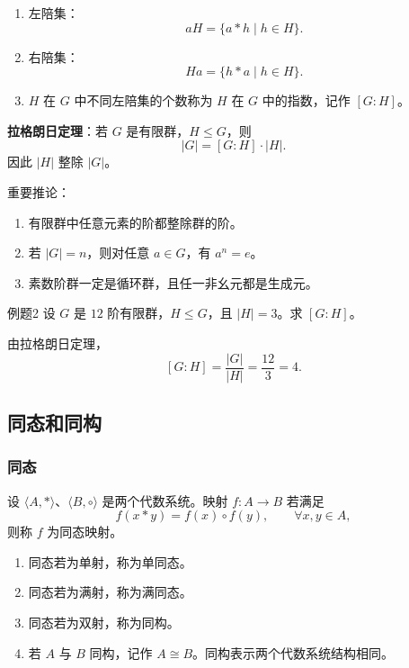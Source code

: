 \begin{enumerate}
	\item 左陪集：
	\[
	aH=\{a*h\mid h\in H\}.
	\]
	\item 右陪集：
	\[
	Ha=\{h*a\mid h\in H\}.
	\]
	\item \(H\) 在 \(G\) 中不同左陪集的个数称为 \(H\) 在 \(G\) 中的指数，记作 \([G:H]\)。
\end{enumerate}

\textbf{拉格朗日定理}：若 \(G\) 是有限群，\(H\le G\)，则
\[
|G|=[G:H]\cdot |H|.
\]
因此 \(|H|\) 整除 \(|G|\)。

重要推论：
\begin{enumerate}
	\item 有限群中任意元素的阶都整除群的阶。
	\item 若 \(|G|=n\)，则对任意 \(a\in G\)，有 \(a^n=e\)。
	\item 素数阶群一定是循环群，且任一非幺元都是生成元。
\end{enumerate}

\begin{question}{例题2}
	设 \(G\) 是 \(12\) 阶有限群，\(H\le G\)，且 \(|H|=3\)。求 \([G:H]\)。
	
	\begin{solution}
	由拉格朗日定理，
	\[
	[G:H]=\frac{|G|}{|H|}=\frac{12}{3}=4.
	\]
	\end{solution}
\end{question}

\subsection{同态和同构}

\subsubsection{同态}

设 \(\langle A,*\rangle\)、\(\langle B,\circ\rangle\) 是两个代数系统。映射 \(f:A\to B\) 若满足
\[
f(x*y)=f(x)\circ f(y),\qquad \forall x,y\in A,
\]
则称 \(f\) 为同态映射。

\begin{enumerate}
	\item 同态若为单射，称为单同态。
	\item 同态若为满射，称为满同态。
	\item 同态若为双射，称为同构。
	\item 若 \(A\) 与 \(B\) 同构，记作 \(A\cong B\)。同构表示两个代数系统结构相同。
\end{enumerate}

